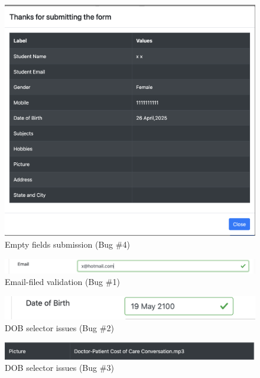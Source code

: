 \documentclass[12pt,a4paper]{article}
\begin{document}
\begin{figure}[h!]
    \centering
    \includegraphics[width=0.5\linewidth]{images/Screenshot 2025-04-26 at 01.20.48.png}
    \caption{Empty fields submission (Bug \#4)}
    \label{fig:enter-label}
\end{figure}

\begin{figure}[h!]
    \centering
    \includegraphics[width=0.5\linewidth]{images/Screenshot 2025-04-26 at 01.23.40.png}
    \caption{Email-filed validation (Bug \#1)}
    \label{fig:enter-label}
\end{figure}

\begin{figure}[h!]
    \centering
    \includegraphics[width=0.5\linewidth]{images/Screenshot 2025-04-26 at 01.26.12.png}
    \caption{DOB selector issues (Bug \#2)}
    \label{fig:enter-label}
\end{figure}

\begin{figure}[h!]
    \centering
    \includegraphics[width=0.5\linewidth]{images/Screenshot 2025-04-26 at 01.28.40.png}
    \caption{DOB selector issues (Bug \#3)}
    \label{fig:enter-label}
\end{figure}
\end{document}
